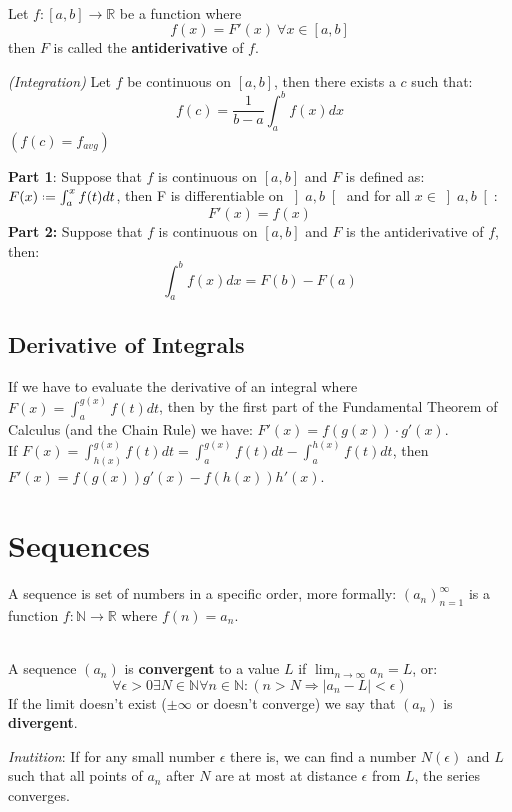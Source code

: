 \documentclass[8pt,a4paper]{extarticle}     %
\theoremstyle{definition}
\theoremstyle{definition}
\theoremstyle{definition}
\newcommand{\R}{\mathbb{R}}
\newcommand{\N}{\mathbb{N}}
\newcommand*{\defeq}{\mathrel{\vcenter{\baselineskip0.5ex \lineskiplimit0pt
            \hbox{\scriptsize.}\hbox{\scriptsize.}}}%
            =}
\begin{document}
\begin{multicols}{4}
\begin{bulletlist}
\end{bulletlist}
\begin{boxdefinition}[Antiderivative] \ \\ 
	Let $f:[a,b]\rightarrow\R$ be a function where $$f(x) = F'(x) \ \forall x\in[a,b]$$ then $F$ is called the \textbf{antiderivative} of $f$.
\end{boxdefinition}	
\begin{boxtheorem}
	\textit{(Integration)} Let $f$ be continuous on $[a,b]$, then there exists a $c$ such that: $$f(c) = \frac{1}{b-a}\int_a^b f(x)dx$$
	$(f(c) = f_{avg})$	
\end{boxtheorem}
\begin{boxtheorem}
	\textbf{Part 1}: Suppose that $f$ is continuous on $[a,b]$ and $F$ is defined as: $F(x) \defeq \int_a^x f(t)dt$, then F is differentiable on $\left]a,b\right[$ and for all $x\in\left]a,b\right[$: $$F'(x) = f(x) $$
	\textbf{Part 2:} Suppose that $f$ is continuous on $[a,b]$ and $F$ is the antiderivative of $f$, then: 
	$$\int_a^b f(x)dx = F(b) - F(a)$$  
\end{boxtheorem}
\subsection{Derivative of Integrals}
If we have to evaluate the derivative of an integral where $F(x) = \int_{a}^{g(x)}f(t)dt$, then by the first part of the Fundamental Theorem of Calculus (and the Chain Rule) we have: $F'(x) = f(g(x))\cdot g'(x)$. \\
If $F(x) = \int_{h(x)}^{g(x)}f(t)dt = \int_{a}^{g(x)}f(t)dt - \int_{a}^{h(x)}f(t)dt$, then $F'(x) = f(g(x))g'(x) - f(h(x))h'(x)$.

\vfill\eject
\columnbreak

\section{Sequences}
\begin{boxdefinition}[Sequence]
	A sequence is set of numbers in a specific order, more formally:
	$(a_n)_{n=1}^\infty$ is a function $f:\N \rightarrow \R$ where $f(n) = a_n$.  
\end{boxdefinition}
\begin{boxdefinition}[Convergence] \ \\
	A sequence $(a_n)$ is \textbf{convergent} to a value $L$ if $\lim_{n\to\infty}a_n = L$, or: \\
	$$\forall\epsilon>0\exists N\in\N \forall n\in\N: (n>N \Rightarrow |a_n-L|<\epsilon)$$
	If the limit doesn't exist ($\pm\infty$ or doesn't converge) we say that $(a_n)$ is \textbf{divergent}.
\end{boxdefinition}	
\textit{Inutition}: If for any small number $\epsilon$ there is, we can find a number $N(\epsilon)$ and $L$ such that all points of $a_n$ after $N$ are at most at distance $\epsilon$ from $L$, the series converges.  

\end{multicols}
\end{document}
